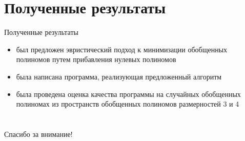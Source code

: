 \documentclass{beamer}
\begin{document}
\section[Результаты]{Полученные результаты}
\begin{frame}{Полученные результаты}

\begin{itemize}
    \item был предложен эвристический подход к минимизации обобщенных полиномов путем прибавления нулевых полиномов
    \item была написана программа, реализующая предложенный алгоритм
    \item была проведена оценка качества программы на случайных обобщенных полиномах из пространств обобщенных полиномов размерностей 3 и 4
\end{itemize}

\end{frame}

\section{}
\begin{frame}
\centering \huge{Спасибо за внимание!}
\end{frame}
\end{document}
